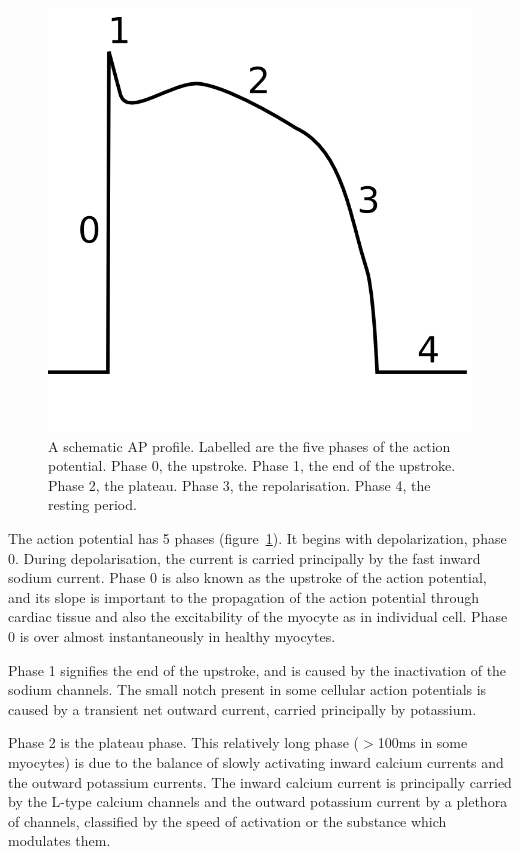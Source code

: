 \begin{figure}
\begin{center}
\includegraphics{figures/intro/ap_profile}
\end{center}
\caption[Schematic AP Profile]{
\label{fig:intro:heart:ap}
A schematic AP profile.
Labelled are the five phases of the action potential.
Phase 0, the upstroke.
Phase 1, the end of the upstroke.
Phase 2, the plateau.
Phase 3, the repolarisation.
Phase 4, the resting period.
}
\end{figure}

The action potential has 5 phases (figure~\ref{fig:intro:heart:ap}).
It begins with depolarization, phase 0.
During depolarisation, the current is carried principally by the fast inward
sodium current.
Phase 0 is also known as the upstroke of the action potential, and its slope is
important to the propagation of the action potential through cardiac tissue and
also the excitability of the myocyte as in individual cell.
Phase 0 is over almost instantaneously in healthy myocytes.

Phase 1 signifies the end of the upstroke, and is caused by the inactivation of
the sodium channels.
The small notch present in some cellular action potentials is caused by a
transient net outward current, carried principally by potassium.

Phase 2 is the plateau phase.  This relatively long phase ($>$100ms in some
myocytes) is due to the balance of slowly activating inward calcium currents and
the outward potassium currents.
The inward calcium current is principally carried by the L-type calcium channels
and the outward potassium current by a plethora of channels, classified by the
speed of activation or the substance which modulates them.

